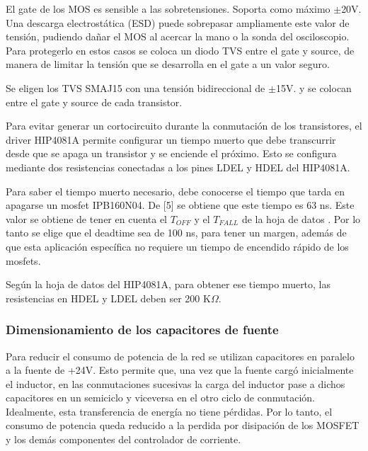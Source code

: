 
\noindent El gate de los MOS es sensible a las sobretensiones. Soporta como máximo $\pm$20V. Una descarga electrostática (ESD) puede sobrepasar ampliamente este valor de tensión, pudiendo dañar el MOS al acercar la mano o la sonda del osciloscopio. Para protegerlo en estos casos se coloca un diodo TVS entre el gate y source, de manera de limitar la tensión que se desarrolla en el gate a un valor seguro.

\noindent Se eligen los TVS SMAJ15 con una tensión bidireccional de $\pm$15V. y se colocan entre el gate y source de cada transistor.


\noindent Para evitar generar un cortocircuito durante la conmutación de los transistores, el driver HIP4081A permite configurar un tiempo muerto que debe transcurrir desde que se apaga un transistor y se enciende el próximo. Esto se configura mediante dos resistencias conectadas a los pines LDEL y HDEL del HIP4081A.

\noindent Para saber el tiempo muerto necesario, debe conocerse el tiempo que tarda en apagarse un mosfet IPB160N04. De [5] se obtiene que este tiempo es 63 ns. Este valor se obtiene de tener en cuenta el $T_{OFF}$ y el $T_{FALL}$ de la hoja de datos . Por lo tanto se elige que el deadtime sea de 100 ns, para tener un margen, además de que esta aplicación específica no requiere un tiempo de encendido rápido de los mosfets.

\noindent Según la hoja de datos del HIP4081A, para obtener ese tiempo muerto, las resistencias en HDEL y LDEL deben ser 200 K$\Omega$.

\subsubsection{Dimensionamiento de los capacitores de fuente}
	
\noindent Para reducir el consumo de potencia de la red se utilizan capacitores en paralelo a la fuente de +24V. Esto permite que, una vez que la fuente cargó inicialmente el inductor, en las conmutaciones sucesivas la carga del inductor pase a dichos capacitores en un semiciclo y viceversa en el otro ciclo de conmutación. Idealmente, esta transferencia de energía no tiene pérdidas. Por lo tanto, el consumo de potencia queda reducido a la perdida por disipación de los MOSFET y los demás componentes del controlador de corriente. 

